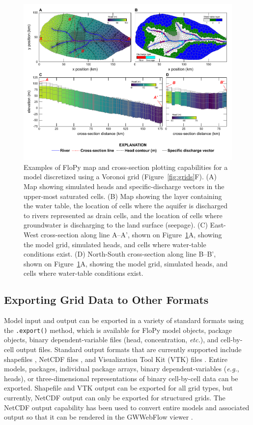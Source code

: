 \documentclass[12pt, oneside]{article}  	%
\begin{document}
\begin{figure}[ht!]
	\begin{center}
		\includegraphics{figures/grids_flopy_plots.pdf}
	\end{center}
	\caption{Examples of FloPy map and cross-section plotting capabilities for a model discretized using a Voronoi grid (Figure~\ref{fig:grids}F). (A) Map showing simulated heads and specific-discharge vectors in the upper-most saturated cells. (B) Map showing the layer containing the water table, the location of cells where the aquifer is discharged to rivers represented as drain cells, and the location of cells where groundwater is discharging to the land surface (seepage). (C) East-West cross-section along line A--A', shown on Figure~\ref{fig:flopyplots}A, showing the model grid, simulated heads, and cells where water-table conditions exist. (D) North-South cross-section along line B--B', shown on Figure~\ref{fig:flopyplots}A, showing the model grid, simulated heads, and cells where water-table conditions exist.}
	\label{fig:flopyplots}
\end{figure}

\subsection*{Exporting Grid Data to Other Formats}

Model input and output can be exported in a variety of standard formats using the \texttt{.export()} method, which is available for FloPy model objects, package objects, binary dependent-variable files (head, concentration, \textit{etc.}), and cell-by-cell output files. Standard output formats that are currently supported include shapefiles \citep{environmental1998esri}, NetCDF files \citep{rew2006netcdf, rew1990netcdf}, and Visualization Tool Kit (VTK) files \citep{schroeder:2006:VTK}. Entire models, packages, individual package arrays, binary dependent-variables (\textit{e.g.}, heads), or three-dimensional representations of binary cell-by-cell data can be exported. Shapefile and VTK output can be exported for all grid types, but currently, NetCDF output can only be exported for structured grids. The NetCDF output capability has been used to convert entire models and associated output so that it can be rendered in the GWWebFlow viewer \citep{gswebflow2018}.
\end{document}
